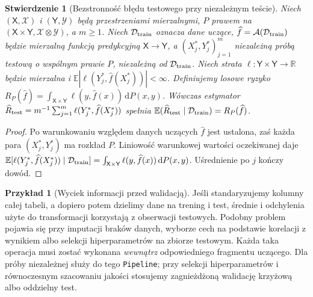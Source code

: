 \documentclass[11pt,a4paper,oneside]{report}
\numberwithin{equation}{chapter}
\theoremstyle{plain}
\newtheorem{stwierdzenie}[twierdzenie]{Stwierdzenie}
\theoremstyle{definition}
\newtheorem{przyklad}{Przykład}[chapter]
\theoremstyle{remark}
\newcommand{\R}{\mathbb R}
\newcommand{\E}{\mathbb E}
\newcommand{\dd}{\mathrm d}
\begin{document}
\begin{stwierdzenie}[Bezstronność błędu testowego przy niezależnym teście]
\label{prop:test-unbiased}
Niech $(\mathsf X,\mathcal X)$ i $(\mathsf Y,\mathcal Y)$ będą przestrzeniami mierzalnymi, $P$ prawem na $(\mathsf X\times\mathsf Y,\mathcal X\otimes\mathcal Y)$, a $m\ge1$. Niech $\mathcal D_{\rm train}$ oznacza dane uczące, $\widehat f=\mathcal A(\mathcal D_{\rm train})$ będzie mierzalną funkcją predykcyjną $\mathsf X\to\mathsf Y$, a $(X_j^*,Y_j^*)_{j=1}^m$ niezależną próbą testową o wspólnym prawie $P$, niezależną od $\mathcal D_{\rm train}$. Niech strata $\ell:\mathsf Y\times\mathsf Y\to\R$ będzie mierzalna i $\E|\ell(Y_j^*,\widehat f(X_j^*))|<\infty$. Definiujemy losowe ryzyko $R_P(\widehat f)=\int_{\mathsf X\times\mathsf Y}\ell(y,\widehat f(x))\,\dd P(x,y)$. Wówczas estymator
$\widehat R_{\rm test}=m^{-1}\sum_{j=1}^m
\ell(Y_j^*,\widehat f(X_j^*))$
spełnia $\E(\widehat R_{\rm test}\mid\mathcal D_{\rm train})
=R_P(\widehat f)$.
\end{stwierdzenie}
\begin{proof}
Po warunkowaniu względem danych uczących $\widehat f$
jest ustalona, zaś każda para $(X_j^*,Y_j^*)$ ma rozkład $P$.
Liniowość warunkowej wartości oczekiwanej daje
$\E[\ell(Y_j^*,\widehat f(X_j^*))\mid\mathcal D_{\rm train}]
=\int_{\mathsf X\times\mathsf Y}\ell(y,\widehat f(x))\,\dd P(x,y)$.
Uśrednienie po $j$ kończy dowód.
\end{proof}

\begin{przyklad}[Wyciek informacji przed walidacją]
Jeśli standaryzujemy kolumny całej tabeli, a dopiero potem
dzielimy dane na trening i test, średnie i odchylenia użyte
do transformacji korzystają z obserwacji testowych. Podobny
problem pojawia się przy imputacji braków danych, wyborze cech
na podstawie korelacji z wynikiem albo selekcji hiperparametrów
na zbiorze testowym. Każda taka operacja musi zostać wykonana
\emph{wewnątrz} odpowiedniego fragmentu uczącego.
Dla próby niezależnej służy do tego \texttt{Pipeline}; przy
selekcji hiperparametrów i równoczesnym szacowaniu jakości
stosujemy zagnieżdżoną walidację krzyżową albo oddzielny test.
\end{przyklad}

\begin{center}
\end{center}
\end{document}
